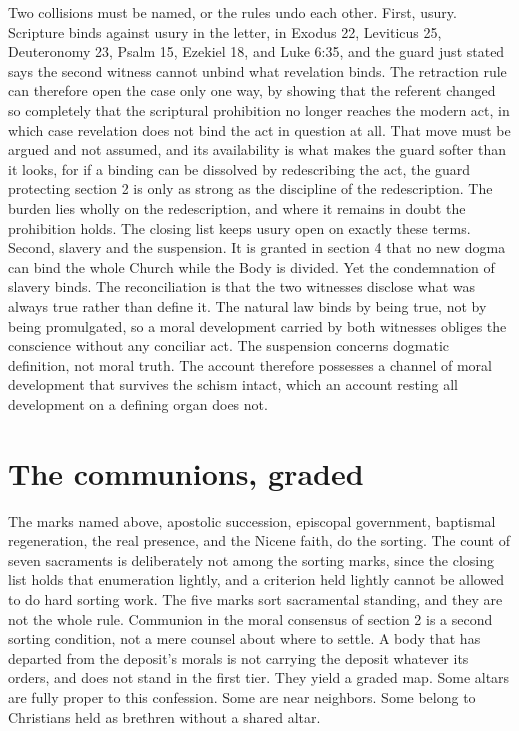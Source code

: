\documentclass[11pt,twoside]{article}
\newcommand{\unit}[1]{\needspace{3\baselineskip}\par\medskip{\normalfont\bfseries\color{subhead}#1}\par\nobreak\smallskip}
\begin{document}
\unit{How the rules interact.}
Two collisions must be named, or the rules undo each other. First, usury. Scripture binds against usury in the letter, in Exodus 22, Leviticus 25, Deuteronomy 23, Psalm 15, Ezekiel 18, and Luke 6:35, and the guard just stated says the second witness cannot unbind what revelation binds. The retraction rule can therefore open the case only one way, by showing that the referent changed so completely that the scriptural prohibition no longer reaches the modern act, in which case revelation does not bind the act in question at all. That move must be argued and not assumed, and its availability is what makes the guard softer than it looks, for if a binding can be dissolved by redescribing the act, the guard protecting section 2 is only as strong as the discipline of the redescription. The burden lies wholly on the redescription, and where it remains in doubt the prohibition holds. The closing list keeps usury open on exactly these terms. Second, slavery and the suspension. It is granted in section 4 that no new dogma can bind the whole Church while the Body is divided. Yet the condemnation of slavery binds. The reconciliation is that the two witnesses disclose what was always true rather than define it. The natural law binds by being true, not by being promulgated, so a moral development carried by both witnesses obliges the conscience without any conciliar act. The suspension concerns dogmatic definition, not moral truth. The account therefore possesses a channel of moral development that survives the schism intact, which an account resting all development on a defining organ does not.

\section{The communions, graded}

The marks named above, apostolic succession, episcopal government, baptismal regeneration, the real presence, and the Nicene faith, do the sorting. The count of seven sacraments is deliberately not among the sorting marks, since the closing list holds that enumeration lightly, and a criterion held lightly cannot be allowed to do hard sorting work. The five marks sort sacramental standing, and they are not the whole rule. Communion in the moral consensus of section 2 is a second sorting condition, not a mere counsel about where to settle. A body that has departed from the deposit's morals is not carrying the deposit whatever its orders, and does not stand in the first tier. They yield a graded map. Some altars are fully proper to this confession. Some are near neighbors. Some belong to Christians held as brethren without a shared altar.
\end{document}
